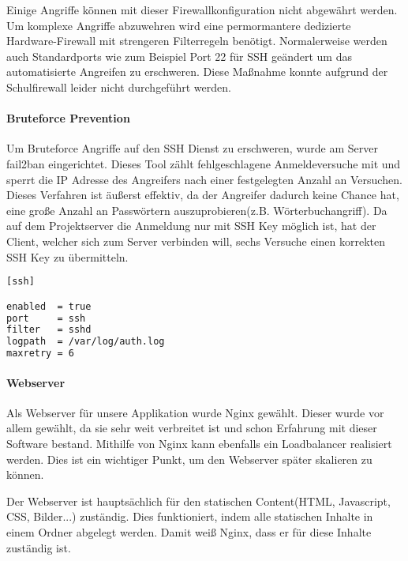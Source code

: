 Einige Angriffe können mit dieser Firewallkonfiguration nicht abgewährt werden. Um komplexe Angriffe abzuwehren wird eine permormantere dedizierte Hardware-Firewall mit strengeren Filterregeln benötigt. Normalerweise werden auch Standardports wie zum Beispiel Port 22 für SSH geändert um das automatisierte Angreifen zu erschweren. Diese Maßnahme konnte aufgrund der Schulfirewall leider nicht durchgeführt werden.

\paragraph{Bruteforce Prevention}
Um Bruteforce Angriffe auf den SSH Dienst zu erschweren, wurde am Server fail2ban eingerichtet. Dieses Tool zählt fehlgeschlagene Anmeldeversuche mit und sperrt die IP Adresse des Angreifers nach einer festgelegten Anzahl an Versuchen. Dieses Verfahren ist äußerst effektiv, da der Angreifer dadurch keine Chance hat, eine große Anzahl an Passwörtern auszuprobieren(z.B. Wörterbuchangriff). Da auf dem Projektserver die Anmeldung nur mit SSH Key möglich ist, hat der Client, welcher sich zum Server verbinden will, sechs Versuche einen korrekten SSH Key zu übermitteln. \cite{FAIL2BAN}

\begin{lstlisting}[caption = Auszug aus der fail2ban Konfiguration, label = fail2ban1, language=bash]
[ssh]

enabled  = true
port     = ssh
filter   = sshd
logpath  = /var/log/auth.log
maxretry = 6
\end{lstlisting}

\paragraph{Webserver}
Als Webserver für unsere Applikation wurde Nginx gewählt. Dieser wurde vor allem gewählt, da sie sehr weit verbreitet ist und schon Erfahrung mit dieser Software bestand. Mithilfe von Nginx kann ebenfalls ein Loadbalancer realisiert werden. Dies ist ein wichtiger Punkt, um den Webserver später skalieren zu können. \\


Der Webserver ist hauptsächlich für den statischen Content(HTML, Javascript, CSS, Bilder...) zuständig. Dies funktioniert, indem alle statischen Inhalte in einem Ordner abgelegt werden. Damit weiß Nginx, dass er für diese Inhalte zuständig ist.

